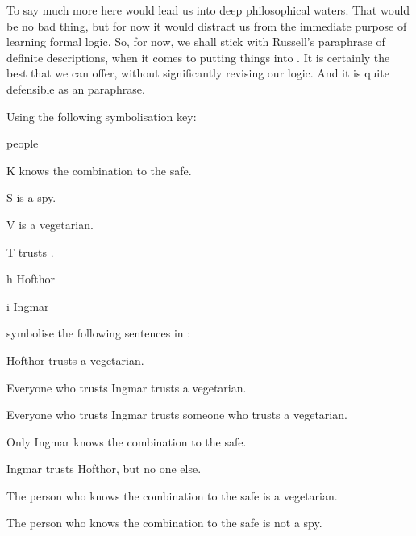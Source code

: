 To say much more here would lead us into deep philosophical waters. That would be no bad thing, but for now it would distract us from the immediate purpose of learning formal logic. So, for now, we shall stick with Russell's paraphrase of definite descriptions, when it comes to putting things into \FOL. It is certainly the best that we can offer, without significantly revising our logic. And it is quite defensible as an paraphrase. 



\practiceproblems

\problempart
Using the following symbolisation key:
\begin{ekey}
\item[\text{domain}] people
\item[K]  knows the combination to the safe.
\item[S]  is a spy.
\item[V]  is a vegetarian.
\item[T]  trusts .
\item[h] Hofthor
\item[i] Ingmar
\end{ekey}
symbolise the following sentences in \FOL:
\begin{earg}
\item Hofthor trusts a vegetarian.
\item Everyone who trusts Ingmar trusts a vegetarian.
\item Everyone who trusts Ingmar trusts someone who trusts a vegetarian.
\item Only Ingmar knows the combination to the safe.
\item Ingmar trusts Hofthor, but no one else.
\item The person who knows the combination to the safe is a vegetarian.
\item The person who knows the combination to the safe is not a spy.
\end{earg}


